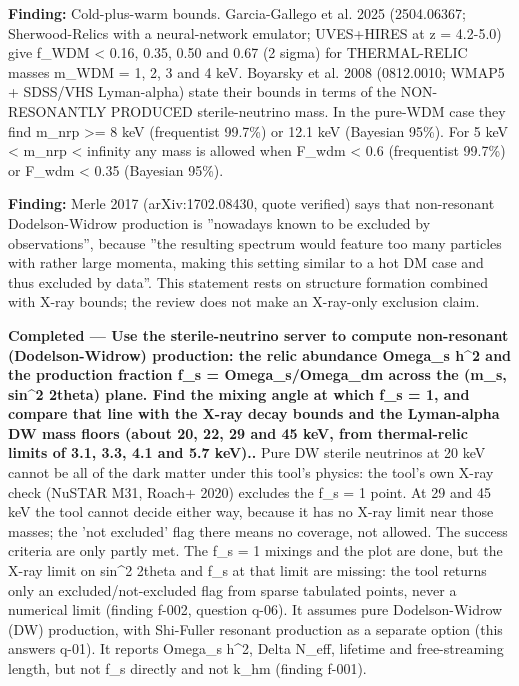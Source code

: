 \documentclass[11pt,a4paper]{article}
\begin{document}
\textbf{Finding:} Cold-plus-warm bounds. Garcia-Gallego et al. 2025 (2504.06367; Sherwood-Relics with a neural-network emulator; UVES+HIRES at z = 4.2-5.0) give f\_WDM \textless{} 0.16, 0.35, 0.50 and 0.67 (2 sigma) for THERMAL-RELIC masses m\_WDM = 1, 2, 3 and 4 keV. Boyarsky et al. 2008 (0812.0010; WMAP5 + SDSS/VHS Lyman-alpha) state their bounds in terms of the NON-RESONANTLY PRODUCED sterile-neutrino mass. In the pure-WDM case they find m\_nrp \textgreater{}= 8 keV (frequentist 99.7\%) or 12.1 keV (Bayesian 95\%). For 5 keV \textless{} m\_nrp \textless{} infinity any mass is allowed when F\_wdm \textless{} 0.6 (frequentist 99.7\%) or F\_wdm \textless{} 0.35 (Bayesian 95\%).

\textbf{Finding:} Merle 2017 (arXiv:1702.08430, quote verified) says that non-resonant Dodelson-Widrow production is ''nowadays known to be excluded by observations'', because ''the resulting spectrum would feature too many particles with rather large momenta, making this setting similar to a hot DM case and thus excluded by data''. This statement rests on structure formation combined with X-ray bounds; the review does not make an X-ray-only exclusion claim.

\textbf{Completed --- Use the sterile-neutrino server to compute non-resonant (Dodelson-Widrow) production: the relic abundance Omega\_s h\textasciicircum{}2 and the production fraction f\_s = Omega\_s/Omega\_dm across the (m\_s, sin\textasciicircum{}2 2theta) plane. Find the mixing angle at which f\_s = 1, and compare that line with the X-ray decay bounds and the Lyman-alpha DW mass floors (about 20, 22, 29 and 45 keV, from thermal-relic limits of 3.1, 3.3, 4.1 and 5.7 keV)..} Pure DW sterile neutrinos at 20 keV cannot be all of the dark matter under this tool's physics: the tool's own X-ray check (NuSTAR M31, Roach+ 2020) excludes the f\_s = 1 point. At 29 and 45 keV the tool cannot decide either way, because it has no X-ray limit near those masses; the 'not excluded' flag there means no coverage, not allowed. The success criteria are only partly met. The f\_s = 1 mixings and the plot are done, but the X-ray limit on sin\textasciicircum{}2 2theta and f\_s at that limit are missing: the tool returns only an excluded/not-excluded flag from sparse tabulated points, never a numerical limit (finding f-002, question q-06). It assumes pure Dodelson-Widrow (DW) production, with Shi-Fuller resonant production as a separate option (this answers q-01). It reports Omega\_s h\textasciicircum{}2, Delta N\_eff, lifetime and free-streaming length, but not f\_s directly and not k\_hm (finding f-001).
\end{document}

